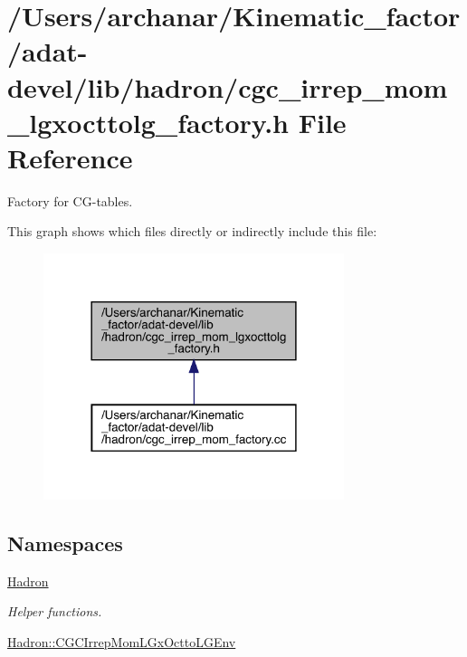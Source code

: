 \hypertarget{adat-devel_2lib_2hadron_2cgc__irrep__mom__lgxocttolg__factory_8h}{}\section{/\+Users/archanar/\+Kinematic\+\_\+factor/adat-\/devel/lib/hadron/cgc\+\_\+irrep\+\_\+mom\+\_\+lgxocttolg\+\_\+factory.h File Reference}
\label{adat-devel_2lib_2hadron_2cgc__irrep__mom__lgxocttolg__factory_8h}


Factory for C\+G-\/tables.  


This graph shows which files directly or indirectly include this file\+:
\nopagebreak
\begin{figure}[H]
\begin{center}
\leavevmode
\includegraphics[width=249pt]{dd/dd8/adat-devel_2lib_2hadron_2cgc__irrep__mom__lgxocttolg__factory_8h__dep__incl}
\end{center}
\end{figure}
\subsection*{Namespaces}
\begin{DoxyCompactItemize}
\item 
 \mbox{\hyperlink{namespaceHadron}{Hadron}}
\begin{DoxyCompactList}\small\item\em Helper functions. \end{DoxyCompactList}\item 
 \mbox{\hyperlink{namespaceHadron_1_1CGCIrrepMomLGxOcttoLGEnv}{Hadron\+::\+C\+G\+C\+Irrep\+Mom\+L\+Gx\+Octto\+L\+G\+Env}}
\end{DoxyCompactItemize}
